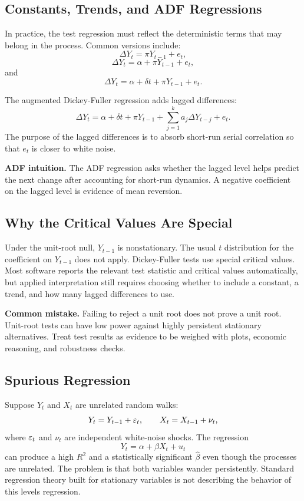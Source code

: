 \subsection{Constants, Trends, and ADF Regressions}
In practice, the test regression must reflect the deterministic terms that may belong in the process. Common versions include:
\[
\Delta Y_t=\pi Y_{t-1}+e_t,
\]
\[
\Delta Y_t=\alpha+\pi Y_{t-1}+e_t,
\]
and
\[
\Delta Y_t=\alpha+\delta t+\pi Y_{t-1}+e_t.
\]

The augmented Dickey-Fuller regression adds lagged differences:
\begin{equation}
\Delta Y_t=\alpha+\delta t+\pi Y_{t-1}
+\sum_{j=1}^{k}a_j\Delta Y_{t-j}+e_t.
\label{eq:adf}
\end{equation}
The purpose of the lagged differences is to absorb short-run serial correlation so that $e_t$ is closer to white noise.

\begin{boxD}
\textbf{ADF intuition.}
The ADF regression asks whether the lagged level helps predict the next change after accounting for short-run dynamics. A negative coefficient on the lagged level is evidence of mean reversion.
\end{boxD}

\subsection{Why the Critical Values Are Special}
Under the unit-root null, $Y_{t-1}$ is nonstationary. The usual $t$ distribution for the coefficient on $Y_{t-1}$ does not apply. Dickey-Fuller tests use special critical values. Most software reports the relevant test statistic and critical values automatically, but applied interpretation still requires choosing whether to include a constant, a trend, and how many lagged differences to use.

\begin{boxF}
\textbf{Common mistake.}
Failing to reject a unit root does not prove a unit root. Unit-root tests can have low power against highly persistent stationary alternatives. Treat test results as evidence to be weighed with plots, economic reasoning, and robustness checks.
\end{boxF}

\subsection{Spurious Regression}
Suppose $Y_t$ and $X_t$ are unrelated random walks:
\[
Y_t=Y_{t-1}+\varepsilon_t,
\qquad
X_t=X_{t-1}+\nu_t,
\]
where $\varepsilon_t$ and $\nu_t$ are independent white-noise shocks. The regression
\[
Y_t=\alpha+\beta X_t+u_t
\]
can produce a high $R^2$ and a statistically significant $\hat{\beta}$ even though the processes are unrelated. The problem is that both variables wander persistently. Standard regression theory built for stationary variables is not describing the behavior of this levels regression.

